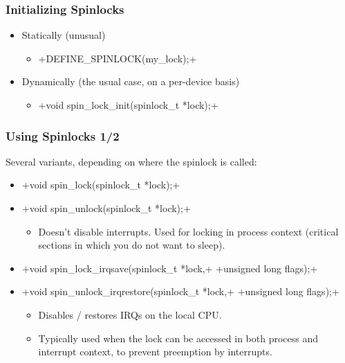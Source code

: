 \begin{frame}[fragile]
  \frametitle{Initializing Spinlocks}
  \begin{itemize}
  \item Statically (unusual)
    \begin{itemize}
    \item {}+DEFINE_SPINLOCK(my_lock);+
    \end{itemize}
  \item Dynamically (the usual case, on a per-device basis) 
    \begin{itemize}
    \item {}+void spin_lock_init(spinlock_t *lock);+
    \end{itemize}
  \end{itemize}
\end{frame}

\begin{frame}[fragile]
  \frametitle{Using Spinlocks 1/2}
  Several variants, depending on where the spinlock is called:
  \begin{itemize}
  \item {}+void spin_lock(spinlock_t *lock);+
  \item {}+void spin_unlock(spinlock_t *lock);+
    \begin{itemize}
    \item Doesn't disable interrupts. Used for locking in process
      context (critical sections in which you do not want to sleep).
    \end{itemize}
  \item {}+void spin_lock_irqsave(spinlock_t *lock,+
    +unsigned long flags);+
  \item {}+void spin_unlock_irqrestore(spinlock_t *lock,+
    +unsigned long flags);+
    \begin{itemize}
    \item Disables / restores IRQs on the local CPU.
    \item Typically used when the lock can be accessed in both process
      and interrupt context, to prevent preemption by interrupts.
    \end{itemize}
  \end{itemize}
\end{frame}

